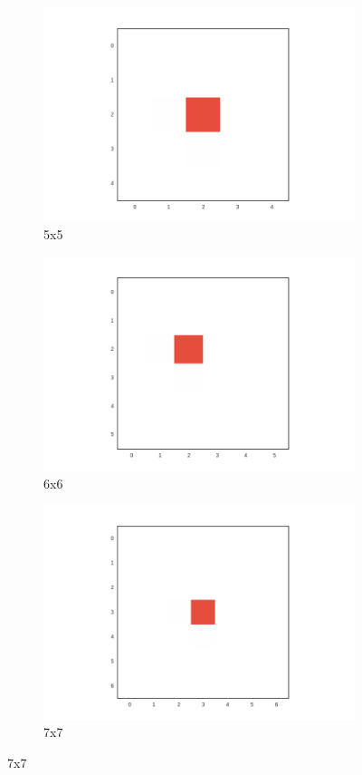 \begin{figure}
\centering
\begin{subfigure}[b]{.30\columnwidth}
\centering
\includegraphics[width=\columnwidth]{fig/seed_5x5}
\caption{5x5}
\end{subfigure}%
\begin{subfigure}[b]{.30\columnwidth}
\centering
\includegraphics[width=\columnwidth]{fig/seed_6x6}
\caption{6x6}
\end{subfigure}%
\begin{subfigure}[b]{.30\columnwidth}
\centering
\includegraphics[width=\columnwidth]{fig/seed_7x7}
\caption{7x7}
\end{subfigure}%


\end{figure}
